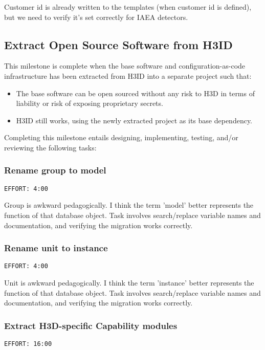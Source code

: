 \documentclass[11pt]{article}
\begin{document}
Customer id is already written to the templates (when customer id is defined), but we need to verify
it's set correctly for IAEA detectors.

\subsection{Extract Open Source Software from H3ID}
\label{sec:org8dd56f1}

This milestone is complete when the base software and configuration-as-code infrastructure has been
extracted from H3ID into a separate project such that:

\begin{itemize}
\item The base software can be open sourced without any risk to H3D in terms of liability or risk of
exposing proprietary secrets.
\item H3ID still works, using the newly extracted project as its base dependency.
\end{itemize}

Completing this milestone entails designing, implementing, testing, and/or reviewing the following
tasks:

\subsubsection{Rename group to model}
\label{sec:org682d7ca}
\begin{verbatim}
EFFORT: 4:00
\end{verbatim}

Group is awkward pedagogically. I think the term 'model' better represents the function of that
database object. Task involves search/replace variable names and documentation, and verifying the
migration works correctly.

\subsubsection{Rename unit to instance}
\label{sec:orgc0bf65f}
\begin{verbatim}
EFFORT: 4:00
\end{verbatim}

Unit is awkward pedagogically. I think the term 'instance' better represents the function of that
database object. Task involves search/replace variable names and documentation, and verifying the
migration works correctly.

\subsubsection{Extract H3D-specific Capability modules}
\label{sec:orge1308e2}
\begin{verbatim}
EFFORT: 16:00
\end{verbatim}
\end{document}
